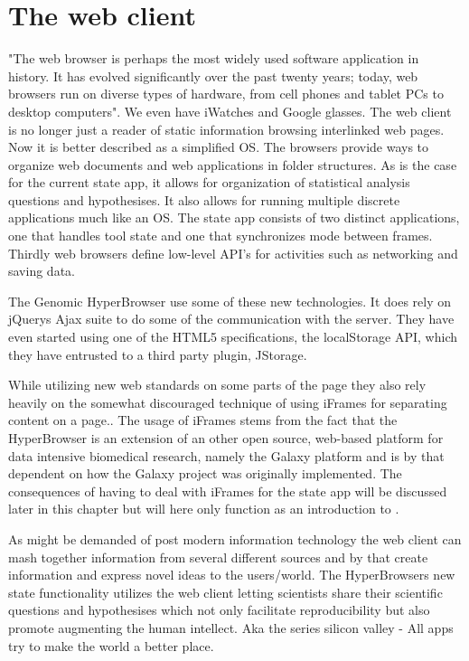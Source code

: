 \documentclass[english]{ifimaster}
\begin{document}
\section{The web client}
"The web browser is perhaps the most widely used software application in history. It has evolved significantly over the past twenty years; today, web browsers run on diverse types of hardware, from cell phones and tablet PCs to desktop computers"\parencite[p. 2]{gross}. We even have iWatches and Google glasses. The web client is no longer just a reader of static information browsing interlinked web pages. Now it is better described as a simplified OS\parencite[p.310]{flanagan}. The browsers provide ways to organize web documents and web applications in folder structures. As is the case for the current state app, it allows for organization of statistical analysis questions and hypothesises. It also allows for running multiple discrete applications much like an OS. The state app consists of two distinct applications, one that handles tool state and one that synchronizes mode between frames. Thirdly web browsers define low-level API's for activities such as networking and saving data. 

The Genomic HyperBrowser use some of these new technologies. It does rely on jQuerys Ajax suite to do some of the communication with the server. They have even started using one of the HTML5 specifications, the localStorage API, which they have entrusted to a third party plugin, JStorage. 

While utilizing new web standards on some parts of the page they also rely heavily on the somewhat discouraged technique of using iFrames for separating content on a page..%
The usage of iFrames stems from the fact that the HyperBrowser is an extension of an other open source, web-based platform for data intensive biomedical research, namely the Galaxy platform and is by that dependent on how the Galaxy project was originally implemented. The consequences of having to deal with iFrames for the state app will be discussed later in this chapter but will here only function as an introduction to .

As might be demanded of post modern information technology the web client can mash together information from several different sources and by that create information and express novel ideas to the users/world. The HyperBrowsers new state functionality utilizes the web client letting scientists share their scientific questions and hypothesises which not only facilitate reproducibility but also promote augmenting the human intellect. Aka the series silicon valley - All apps try to make the world a better place.
\end{document}
